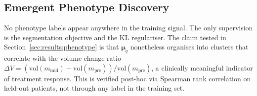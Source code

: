\subsection{Emergent Phenotype Discovery}
\label{sec:method:phenotype}

No phenotype labels appear anywhere in the training signal.  The only
supervision is the segmentation objective and the KL regulariser.  The
claim tested in Section~\ref{sec:results:phenotype} is that $\boldsymbol{\mu}_q$
nonetheless organises into clusters that correlate with the volume-change ratio
$\Delta V = (\mathrm{vol}(m_{\text{mid}}) - \mathrm{vol}(m_{\text{pre}})) /
\mathrm{vol}(m_{\text{pre}})$, a clinically meaningful indicator of treatment
response.  This is verified post-hoc via Spearman rank correlation on held-out
patients, not through any label in the training set.

